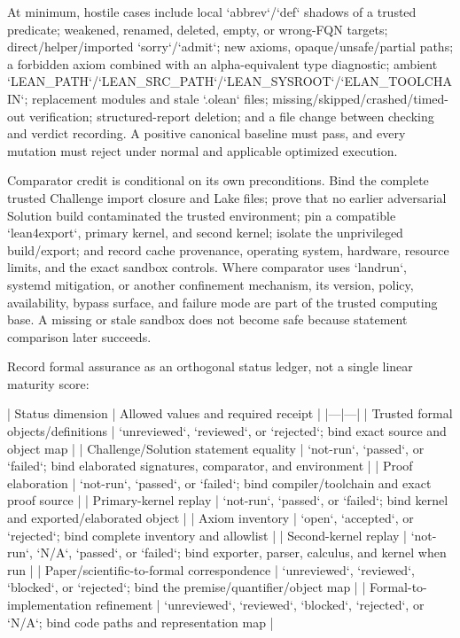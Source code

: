 \documentclass[11pt]{article}
\begin{document}
\begin{markdown}
At minimum, hostile cases include local `abbrev`/`def` shadows of a trusted predicate; weakened,
renamed, deleted, empty, or wrong-FQN targets; direct/helper/imported `sorry`/`admit`; new axioms,
opaque/unsafe/partial paths; a forbidden axiom combined with an alpha-equivalent type diagnostic;
ambient `LEAN_PATH`/`LEAN_SRC_PATH`/`LEAN_SYSROOT`/`ELAN_TOOLCHAIN`; replacement modules and stale
`.olean` files; missing/skipped/crashed/timed-out verification; structured-report deletion; and a
file change between checking and verdict recording. A positive canonical baseline must pass, and
every mutation must reject under normal and applicable optimized execution.

Comparator credit is conditional on its own preconditions. Bind the complete trusted Challenge
import closure and Lake files; prove that no earlier adversarial Solution build contaminated the
trusted environment; pin a compatible `lean4export`, primary kernel, and second kernel; isolate the
unprivileged build/export; and record cache provenance, operating system, hardware, resource
limits, and the exact sandbox controls. Where comparator uses `landrun`, systemd mitigation, or
another confinement mechanism, its version, policy, availability, bypass surface, and failure mode
are part of the trusted computing base. A missing or stale sandbox does not become safe because
statement comparison later succeeds.

Record formal assurance as an orthogonal status ledger, not a single linear maturity score:

| Status dimension | Allowed values and required receipt |
|---|---|
| Trusted formal objects/definitions | `unreviewed`, `reviewed`, or `rejected`; bind exact source and object map |
| Challenge/Solution statement equality | `not-run`, `passed`, or `failed`; bind elaborated signatures, comparator, and environment |
| Proof elaboration | `not-run`, `passed`, or `failed`; bind compiler/toolchain and exact proof source |
| Primary-kernel replay | `not-run`, `passed`, or `failed`; bind kernel and exported/elaborated object |
| Axiom inventory | `open`, `accepted`, or `rejected`; bind complete inventory and allowlist |
| Second-kernel replay | `not-run`, `N/A`, `passed`, or `failed`; bind exporter, parser, calculus, and kernel when run |
| Paper/scientific-to-formal correspondence | `unreviewed`, `reviewed`, `blocked`, or `rejected`; bind the premise/quantifier/object map |
| Formal-to-implementation refinement | `unreviewed`, `reviewed`, `blocked`, `rejected`, or `N/A`; bind code paths and representation map |


\end{markdown}
\end{document}
